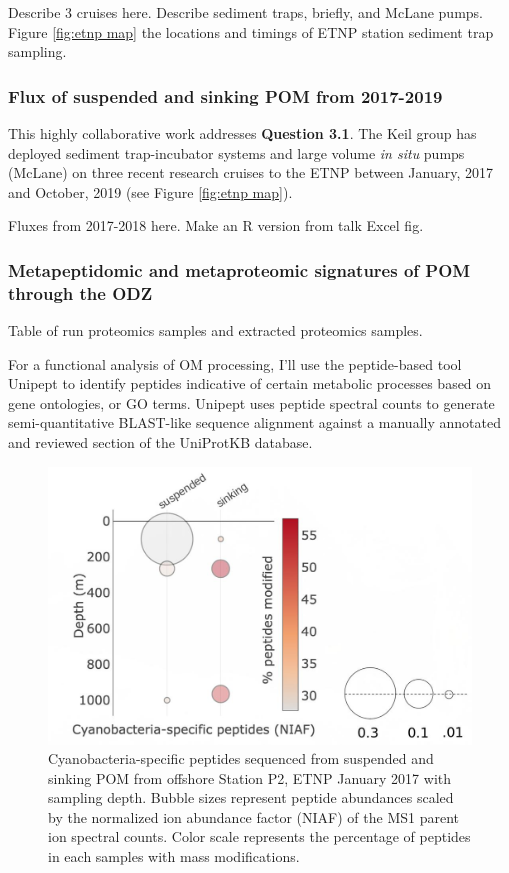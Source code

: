 \documentclass[12pt, letterpaper, twoside]{article}
\begin{document}
Describe 3 cruises here. Describe sediment traps, briefly, and McLane pumps. Figure \ref{fig:etnp map} the locations and timings of ETNP station sediment trap sampling. 


\subsubsection{Flux of suspended and sinking POM from 2017-2019}

This highly collaborative work addresses \textbf{Question 3.1}. The Keil group has deployed sediment trap-incubator systems and large volume \textit{in situ} pumps (McLane) on three recent research cruises to the ETNP between January, 2017 and October, 2019 (see Figure \ref{fig:etnp map}).

\bigskip

Fluxes from 2017-2018 here. Make an R version from talk Excel fig. 

\subsubsection{Metapeptidomic and metaproteomic signatures of POM through the ODZ}

Table of run proteomics samples and extracted proteomics samples.

For a functional analysis of OM processing, I'll use the peptide-based tool Unipept \cite{uniprot_consortium_uniprot:_2018} to identify peptides indicative of certain metabolic processes based on gene ontologies, or GO terms. Unipept uses peptide spectral counts to generate semi-quantitative BLAST-like sequence alignment against a manually annotated and reviewed section of the UniProtKB database.

\begin{figure}
	\includegraphics[width=\linewidth]{etnp2017-cyano-mods.jpg}
	\caption{Cyanobacteria-specific peptides sequenced from suspended and sinking POM from offshore Station P2, ETNP January 2017 with sampling depth. Bubble sizes represent peptide abundances scaled by the normalized ion abundance factor (NIAF) of the MS1 parent ion spectral counts. Color scale represents the percentage of peptides in each samples with mass modifications.}
	\label{fig:cyanomods}
\end{figure}
\end{document}
